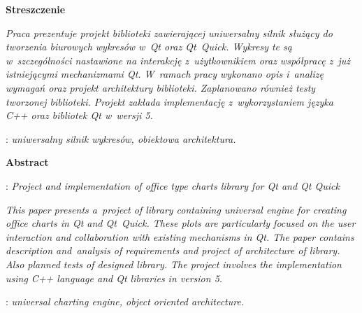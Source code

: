 \begin{titlepage}
    \newpage\thispagestyle{empty}
    \vspace*{2\baselineskip}
    \begin{center}
	{\large\bfseries Streszczenie}\par\bigskip
    \end{center}

    {\itshape
    Praca prezentuje projekt biblioteki zawierającej uniwersalny silnik służący do tworzenia  biurowych wykresów w~Qt oraz Qt~Quick. Wykresy te są w~szczególności nastawione na interakcję z~użytkownikiem oraz współpracę z~już istniejącymi mechanizmami Qt.
	W~ramach pracy wykonano opis i~analizę wymagań oraz projekt architektury biblioteki. Zaplanowano również testy tworzonej biblioteki. Projekt zakłada implementację z~wykorzystaniem języka C++ oraz bibliotek Qt w~wersji 5.
	}
    \vspace*{1\baselineskip}

    : {\itshape uniwersalny silnik wykresów, obiektowa architektura.}
    \par
    \vspace{4\baselineskip}
    \begin{center}
	{\large\bfseries Abstract}\par\bigskip
    \end{center}
    : {\itshape Project and implementation of office type charts library for Qt and Qt Quick}\par
    \vspace*{1\baselineskip}
    {\itshape
    This paper presents a~project of library containing universal engine for creating office charts in Qt and Qt~Quick. These plots are particularly focused on the user interaction and collaboration with existing mechanisms in Qt.
The paper contains description and~analysis of requirements and project of architecture of library. Also planned tests of designed library. The project involves the implementation using C++ language and Qt libraries in version 5.}
    \vspace*{1\baselineskip}

    : {\itshape universal charting engine, object oriented architecture.}

\end{titlepage}

